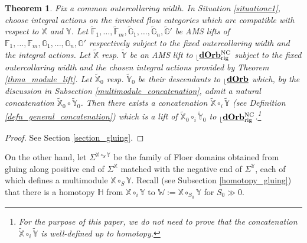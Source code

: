 \documentclass[reqno, 10pt]{amsart}
\numberwithin{equation}{section}
\numberwithin{equation}{section}
\newtheorem{thm}{Theorem}[section]
\theoremstyle{definition}
\theoremstyle{remark}
\newcommand{\mb}{\mathbb}
\renewcommand{\outer}{{}_{\lfloor}}
\newcommand{\uds}[1]{\underline{\smash{#1}}}
\begin{document}
\begin{thm}\label{thm_AMS_concatenation}
Fix a common outercollaring width. In Situation \ref{situationc1}, choose integral actions on the involved flow categories which are compatible with respect to ${\mb X}$ and ${\mb Y}$. Let $\tilde {\mb F}_1, \ldots, \tilde {\mb F}_m, \tilde {\mb G}_1, \ldots, \tilde {\mb G}_n, \tilde {\mb G}'$ be AMS lifts of ${\mb F}_1, \ldots, {\mb F}_m,  {\mb G}_1, \ldots, {\mb G}_n, {\mb G}'$ respectively subject to the fixed outercollaring width and the integral actions. Let $\tilde {\mb X}$ resp. $\tilde {\mb Y}$ be an AMS lift to $\outer \uds{\bf dOrb}_{\rm rig}^{\rm NC}$ subject to the fixed outercollaring width and the chosen integral actions provided by Theorem \ref{thma_module_lift}. Let $\tilde {\mb X}_0$ resp. $\tilde {\mb Y}_0$ be their descendants to $\outer \uds{\bf dOrb}$ which, by the discussion in Subsection \ref{multimodule_concatenation}, admit a natural concatenation $\tilde {\mb X}_0 \circ \tilde {\mb Y}_0$. Then there exists a concatenation $\tilde {\mb X} \circ_i \tilde {\mb Y}$ (see Definition \ref{defn_general_concatenation}) which is a lift of $\tilde {\mb X}_0 \circ_i \tilde {\mb Y}_0$ to $\outer \uds{\bf dOrb}_{\rm rig}^{\rm NC}$.\footnote{For the purpose of this paper, we do not need to prove that the concatenation $\tilde {\mb X} \circ_i \tilde {\mb Y}$ is well-defined up to homotopy.}
\end{thm}

\begin{proof}
See Section \ref{section_gluing}.
\end{proof}




On the other hand, let $\Sigma^{{\mb X} \circ_S {\mb Y}}$ be the family of Floer domains obtained from gluing along positive end of $\Sigma^{\mb X}$ matched with the negative end of $\Sigma^{\mb Y}$, each of which defines a multimodule ${\mb X}\circ_S {\mb Y}$. Recall (see Subsection \ref{homotopy_gluing}) that there is a homotopy ${\mb H}$ from ${\mb X} \circ_i {\mb Y}$ to ${\mb W}:= {\mb X} \circ_{S_0} {\mb Y}$ for $S_0 \gg 0$. 
\end{document}

